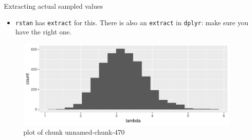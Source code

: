 \documentclass[
  ignorenonframetext,
]{beamer}
\newenvironment{Shaded}{\begin{snugshade}}{\end{snugshade}}
\newcommand{\DataTypeTok}[1]{\textcolor[rgb]{0.13,0.29,0.53}{#1}}
\newcommand{\DecValTok}[1]{\textcolor[rgb]{0.00,0.00,0.81}{#1}}
\newcommand{\KeywordTok}[1]{\textcolor[rgb]{0.13,0.29,0.53}{\textbf{#1}}}
\newcommand{\NormalTok}[1]{#1}
\newcommand{\OperatorTok}[1]{\textcolor[rgb]{0.81,0.36,0.00}{\textbf{#1}}}
\newcommand{\StringTok}[1]{\textcolor[rgb]{0.31,0.60,0.02}{#1}}
\providecommand{\tightlist}{%
  \setlength{\itemsep}{0pt}\setlength{\parskip}{0pt}}
\begin{document}
\begin{frame}[fragile]{Extracting actual sampled values}
\protect\hypertarget{extracting-actual-sampled-values}{}

\begin{itemize}
\tightlist
\item
  \texttt{rstan} has \texttt{extract} for this. There is also an
  \texttt{extract} in \texttt{dplyr}: make sure you have the right one.
\end{itemize}

\begin{Shaded}
\end{Shaded}

\begin{figure}
\centering
\includegraphics{figure/unnamed-chunk-470-1.pdf}
\caption{plot of chunk unnamed-chunk-470}
\end{figure}

\end{frame}
\end{document}
